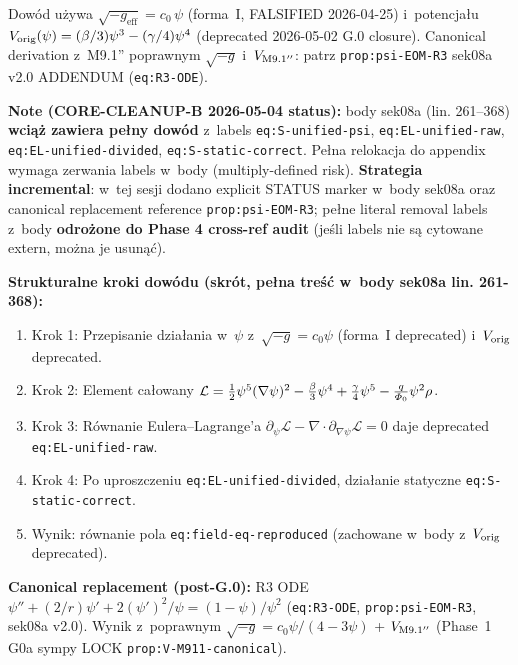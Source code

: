 Dow\'od u\.zywa $\sqrt{-g_{\mathrm{eff}}} = c_0\,\psi$ (forma~I,
FALSIFIED 2026-04-25) i~potencja\l{}u $V_{\rm orig}(\psi) = (\beta/3)\psi^3
- (\gamma/4)\psi^4$ (deprecated 2026-05-02 G.0 closure). Canonical
derivation z~M9.1'' poprawnym $\sqrt{-g}$ i~$V_{\rm M9.1''}$:
patrz \texttt{prop:psi-EOM-R3} sek08a v2.0 ADDENDUM (\texttt{eq:R3-ODE}).

\textbf{Note (CORE-CLEANUP-B 2026-05-04 status):} body sek08a (lin. 261--368)
\textbf{wci\k{a}\.z zawiera pe\l{}ny dow\'od} z~labels \texttt{eq:S-unified-psi},
\texttt{eq:EL-unified-raw}, \texttt{eq:EL-unified-divided},
\texttt{eq:S-static-correct}. Pe\l{}na relokacja do appendix wymaga
zerwania labels w~body (multiply-defined risk). \textbf{Strategia
incremental}: w~tej sesji dodano explicit STATUS marker w~body sek08a
oraz canonical replacement reference \texttt{prop:psi-EOM-R3}; pe\l{}ne
literal removal labels z~body \textbf{odro\.zone do Phase 4 cross-ref audit}
(je\'sli labels nie s\k{a} cytowane extern, mo\.zna je usun\k{a}\'c).

\textbf{Strukturalne kroki dow\'odu (skr\'ot, pe\l{}na tre\'s\'c w~body sek08a
lin. 261-368):}

\begin{enumerate}[(1),nosep]
  \item Krok 1: Przepisanie dzia\l{}ania w~$\psi$ z~$\sqrt{-g}=c_0\psi$
    (forma~I deprecated) i~$V_{\rm orig}$ deprecated.
  \item Krok 2: Element ca\l{}owany $\mathcal{L} = \tfrac{1}{2}\psi^5(\nabla\psi)^2
    - \tfrac{\beta}{3}\psi^4 + \tfrac{\gamma}{4}\psi^5 - \tfrac{q}{\varPhi_0}\psi^2\rho$.
  \item Krok 3: R\'ownanie Eulera--Lagrange'a $\partial_\psi\mathcal{L}
    - \nabla\cdot\partial_{\nabla\psi}\mathcal{L} = 0$ daje deprecated
    \texttt{eq:EL-unified-raw}.
  \item Krok 4: Po uproszczeniu \texttt{eq:EL-unified-divided}, dzia\l{}anie
    statyczne \texttt{eq:S-static-correct}.
  \item Wynik: r\'ownanie pola \texttt{eq:field-eq-reproduced}
    (zachowane w~body z~$V_{\rm orig}$ deprecated).
\end{enumerate}

\textbf{Canonical replacement (post-G.0):} R3 ODE
$\psi'' + (2/r)\psi' + 2(\psi')^2/\psi = (1-\psi)/\psi^2$
(\texttt{eq:R3-ODE}, \texttt{prop:psi-EOM-R3}, sek08a v2.0).
Wynik z~poprawnym $\sqrt{-g}=c_0\psi/(4-3\psi)$ + $V_{\rm M9.1''}$
(Phase~1 G0a sympy LOCK \texttt{prop:V-M911-canonical}).

